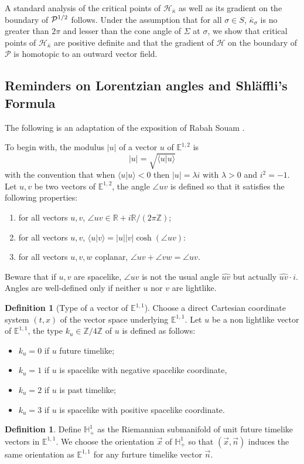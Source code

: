 \documentclass[a4paper,12pt]{article}
\def\ZZ{\mathbb{Z}}
\def\H{\mathbb{H}}
\def\E{\mathbf E}
\def\adm{\P}
\def\E{\mathbb{E}}
\def\RR{\mathbb{R}}
\newcommand{\mass}[1]{{\mathbb E}^{1,2}_{#1}}
\def\E{\mathbb{E}}
\def\adm{\mathcal{P}}
\def\P{\mathcal{P}}
\theoremstyle{definition}
\newtheorem{defi}[lem]{Definition}	%
\begin{document}
				A standard analysis of the critical points of $\mathcal{H}_{\bar\kappa}$ as well as its gradient on the boundary of $\Psq$ follows. Under the assumption that for all $\sigma\in S$, $\bar\kappa_\sigma$ is no greater than $2\pi$ and lesser than the cone angle of $\Sigma$ at $\sigma$, we show that critical points of $\mathcal{H}_{\bar\kappa}$ are positive definite and that the gradient of $\mathcal{H}$ on the boundary of $\adm$ is homotopic to an outward vector field. 
			
				
					
					\subsection{Reminders on Lorentzian angles and Shläffli's Formula}
					The following is an adaptation of the exposition of Rabah Souam \cite{MR2030165}.

					
					To begin with, the modulus $|u|$ of a vector $u$ of $\mass{}$ is
					$$|u|=\sqrt{\langle u|u\rangle}$$
					with the convention that when $\langle u|u\rangle<0$ then $|u|=\lambda i$ with $\lambda>0$ and $i^2=-1$.
					Let $u,v$ be two vectors of $\mass{}$, the angle $\angle uv$ is defined so that it satisfies the following properties:
					\begin{enumerate}
					 \item for all vectors $u,v$, $\angle uv\in \RR+i\RR/(2\pi\ZZ)$;
					 \item for all vectors $u,v$, $\langle u|v\rangle = |u||v|\cosh(\angle uv)$:
					 \item for all vectors $u,v,w$ coplanar, $\angle uv+\angle vw=\angle uv$.
					\end{enumerate}
					Beware that if $u,v$ are spacelike, $\angle uv$ is not the usual angle $\widehat{uv}$ but actually $\widehat{uv}\cdot i$.
					Angles are well-defined only if neither $u$ nor $v$ are lightlike.
					\begin{defi}[Type of a vector of $\E^{1,1}$]\label{def:type_vector}
					Choose a direct Cartesian coordinate system $(t,x)$ of the vector space underlying $\E^{1,1}$.
					Let $u$ be a non lightlike vector of $\E^{1,1}$, the type $k_u\in \ZZ/4\ZZ$ of $u$ is defined as follows:
					\begin{itemize}
					 \item $k_u=0$ if $u$ future timelike;
					 \item $k_u=1$ if $u$ is spacelike with negative spacelike coordinate,
					 \item $k_u=2$ if $u$ is past timelike;
					 \item $k_u=3$ if $u$ is spacelike with positive spacelike coordinate.
					\end{itemize}
					\end{defi}
					\begin{defi}\label{def:define_riemannian_submanifold_unit} Define $\H^1_+$ as the Riemannian submanifold of unit future timelike vectors in $\E^{1,1}$. We choose the orientation $\overrightarrow x$ of  $\H^1_+$ so that $(\overrightarrow x,\overrightarrow n)$ induces the same orientation as $\E^{1,1}$ for any furture timelike vector $\overrightarrow n$. 
					\end{defi}
\end{document}
